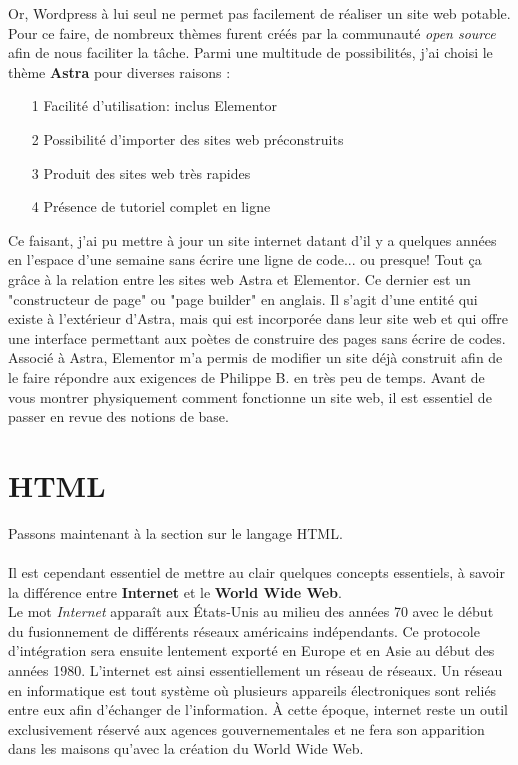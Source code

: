 \documentclass[12pt]{report}
\begin{document}
    Or, Wordpress à lui seul ne permet pas facilement de réaliser un site web potable. Pour ce faire, de nombreux thèmes furent créés par la communauté \textit{open source} afin de nous faciliter la tâche. Parmi une multitude de possibilités, j'ai choisi le thème \textbf{Astra} pour diverses raisons : \\
      \begin{enumerate}
        \item[1] {\large Facilité d'utilisation: inclus Elementor}
        \item[2] {\large Possibilité d'importer des sites web préconstruits}
        \item[3] {\large Produit des sites web très rapides}
        \item[4] {\large Présence de tutoriel complet en ligne}
      \end{enumerate}
    Ce faisant, j'ai pu mettre à jour un site internet datant d'il y a quelques années en l'espace d'une semaine sans écrire une ligne de code... ou presque! Tout ça grâce à la relation entre les sites web Astra et Elementor. Ce dernier est un "constructeur de page" ou "page builder" en anglais. Il s'agit d'une entité qui existe à l'extérieur d'Astra, mais qui est incorporée dans leur site web et qui offre une interface permettant aux poètes de construire des pages sans écrire de codes. Associé à Astra, Elementor m'a permis de modifier un site déjà construit afin de le faire répondre aux exigences de Philippe B. en très peu de temps. Avant de vous montrer physiquement comment fonctionne un site web, il est essentiel de passer en revue des notions de base.  
  
  \section{HTML}
     
     Passons maintenant à la section sur le langage HTML. \\ \\
     
     
     Il est cependant essentiel de mettre au clair quelques concepts essentiels, à savoir la différence entre \textbf{Internet} et le \textbf{World Wide Web}. \\
     
     Le mot \textit{Internet} apparaît aux États-Unis au milieu des années 70 avec le début du fusionnement de différents réseaux américains indépendants. Ce protocole d'intégration sera ensuite lentement exporté en Europe et en Asie au début des années 1980. L'internet est ainsi essentiellement un réseau de réseaux. Un réseau en informatique est tout système où plusieurs appareils électroniques sont reliés entre eux afin d'échanger de l'information. À cette époque, internet reste un outil exclusivement réservé aux agences gouvernementales et ne fera son apparition dans les maisons qu'avec la création du World Wide Web. \\
     
\end{document}
